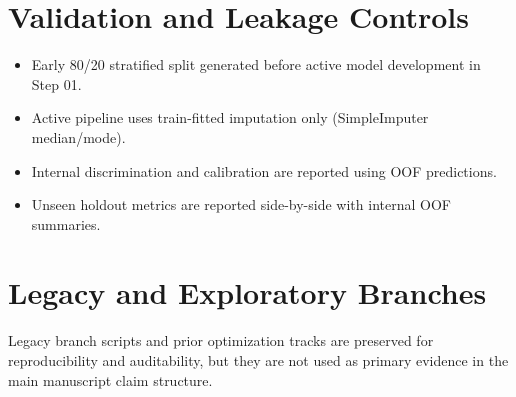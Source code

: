 \documentclass[11pt,a4paper]{article}
\begin{document}
\section{Validation and Leakage Controls}
\begin{itemize}
\item Early 80/20 stratified split generated before active model development in Step 01.
\item Active pipeline uses train-fitted imputation only (SimpleImputer median/mode).
\item Internal discrimination and calibration are reported using OOF predictions.
\item Unseen holdout metrics are reported side-by-side with internal OOF summaries.
\end{itemize}

\section{Legacy and Exploratory Branches}
Legacy branch scripts and prior optimization tracks are preserved for reproducibility and auditability, but they are not used as primary evidence in the main manuscript claim structure.
\end{document}
